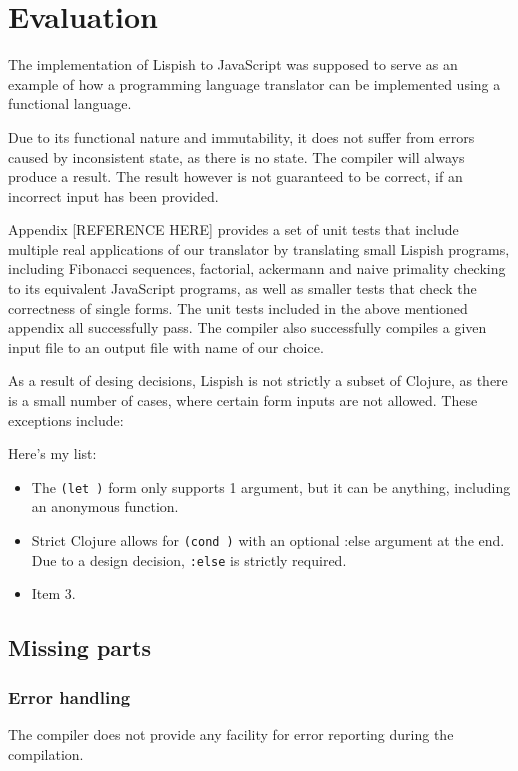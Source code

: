 \chapter{Evaluation}
The implementation of Lispish to JavaScript was supposed to serve as an example of how a programming language translator can be implemented using a functional language.

Due to its functional nature and immutability, it does not suffer from errors caused by inconsistent state, as there is no state. The compiler will always produce a result. The result however is not guaranteed to be correct, if an incorrect input has been provided. 

Appendix [REFERENCE HERE] provides a set of unit tests that include multiple real applications of our translator by translating small Lispish programs, including Fibonacci sequences, factorial, ackermann and naive primality checking to its equivalent JavaScript programs, as well as smaller tests that check the correctness of single forms.
The unit tests included in the above mentioned appendix all successfully pass.
The compiler also successfully compiles a given input file to an output file with name of our choice. 

As a result of desing decisions, Lispish is not strictly a subset of Clojure, as there is a small number of cases, where certain form inputs are not allowed.
These exceptions include:

\noindent Here's my list:

\begin{itemize}
\item The \texttt{(let )} form only supports 1 argument, but it can be anything, including an anonymous function.
\item Strict Clojure allows for \texttt{(cond )} with an optional :else argument at the end. Due to a design decision, \texttt{:else} is strictly required.
\item Item 3.
\end{itemize}

\section{Missing parts}
\subsection{Error handling}
The compiler does not provide any facility for error reporting during the compilation.

